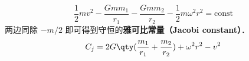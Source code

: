 

\begin{equation}\label{JacCon_eq1}
\frac{1}{2}mv^2 - \frac{Gmm_1}{r_1} - \frac{Gmm_2}{r_2} - \frac{1}{2}m\omega^2 r^2 = \text{const}
\end{equation}
两边同除 $-m/2$ 即可得到守恒的\textbf{雅可比常量（Jacobi constant）}．
\begin{equation}
C_j = 2G\qty(\frac{m_1}{r_1} + \frac{m_2}{r_2}) + \omega^2 r^2 - v^2
\end{equation}
